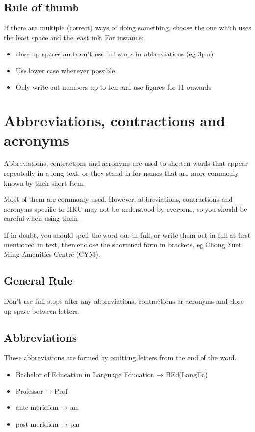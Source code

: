 \documentclass[11pt,a4paper]{book}
\newcommand{\cmark}{{\color{green(html/cssgreen)}\checkmark}}%
\begin{document}
	\section{Rule of thumb}
	If there are multiple (correct) ways of doing something, choose the one which uses the least space and the least ink. For instance:
		\begin{itemize}
			\item close up spaces and don't use full stops in abbreviations (eg 3pm)
			\item Use lower case whenever possible
			\item Only write out numbers up to ten and use figures for 11 onwards
		\end{itemize}
	\chapter{Abbreviations, contractions and acronyms}
	Abbreviations, contractions and acronyms are used to shorten words that appear repeatedly in a long text, or they stand in for names that are more commonly known by their short form.\par
	Most of them are commonly used. However, abbreviations, contractions and acronyms specific to HKU may not be understood by everyone, so you should be careful when using them.\par
	If in doubt, you should spell the word out in full, or write them out in full at first mentioned in text, then enclose the shortened form in brackets, eg Chong Yuet Ming Amenities Centre (CYM).
	\section{General Rule}
	Don't use full stops after any abbreviations, contractions or acronyms and close up space between letters.
	\section{Abbreviations}
	These abbreviations are formed by omitting letters from the end of the word.
	{\firasans \begin{mdframed}[backgroundcolor=aliceblue] \begin{itemize}[label=\cmark]
			\item Bachelor of Education in Language Education → BEd(LangEd)
			\item Professor → Prof
			\item ante  meridiem → am
			\item post  meridiem → pm
		\end{itemize} \end{mdframed} }
	\newpage
\end{document}
